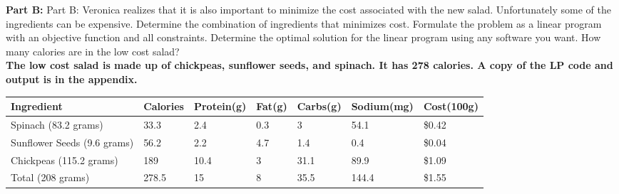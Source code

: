 \documentclass{article}
\begin{document}
\noindent \textbf{Part B: }Part B: Veronica realizes that it is also important to minimize the cost associated with the new salad. Unfortunately some of the ingredients can be expensive. Determine the combination of ingredients that minimizes cost. Formulate the problem as a linear program with an objective function and all constraints. Determine the optimal solution for the linear program using any software you want. How many calories are in the low cost salad?
\\[.25cm]
\textbf{The low cost salad is made up of chickpeas, sunflower seeds, and spinach. It has 278 calories. A copy of the LP code and output is in the appendix.}
\begin{flushleft}
 \begin{tabular}{|| l | l | l | l | l | l | l ||}
 \hline
 Ingredient & Calories & Protein(g) & Fat(g) & Carbs(g) & Sodium(mg) & Cost(100g)\\ 
 \hline\hline
 Spinach (83.2 grams) & 33.3 & 2.4 & 0.3 & 3 & 54.1 & \$0.42 \\ 
 \hline
 Sunflower Seeds (9.6 grams) & 56.2 & 2.2 & 4.7 & 1.4 & 0.4 & \$0.04 \\ 
 \hline 
 Chickpeas (115.2 grams) & 189 & 10.4 & 3 & 31.1 & 89.9 & \$1.09 \\ 
 \hline
 Total (208 grams) & 278.5 & 15 & 8 & 35.5 & 144.4 & \$1.55 \\ 
 \hline
\end{tabular}
\end{flushleft}



\newpage


\end{document}
